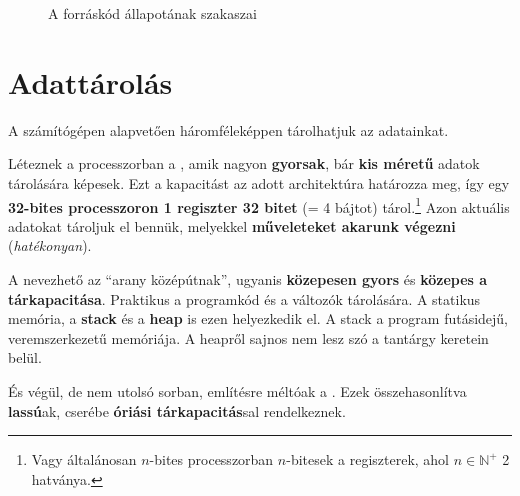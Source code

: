 \begin{figure}[h]
	\centering
	\caption{A forráskód állapotának szakaszai}
\end{figure}

\newpage

\section{Adattárolás}

A számítógépen alapvetően háromféleképpen tárolhatjuk az adatainkat.

Léteznek a processzorban a  , amik nagyon \textbf{gyorsak}, bár \textbf{kis méretű} adatok tárolására képesek. Ezt a kapacitást az adott architektúra határozza meg, így egy \textbf{32-bites processzoron 1 regiszter 32 bitet} (= 4 bájtot) tárol.\footnote{Vagy általánosan $n$-bites processzorban $n$-bitesek a regiszterek, ahol $n\in \mathbb{N}^+$ 2 hatványa.} Azon aktuális adatokat tároljuk el bennük, melyekkel \textbf{műveleteket akarunk végezni} (\textit{hatékonyan}).

A  nevezhető az ``arany középútnak'', ugyanis \textbf{közepesen gyors} és \textbf{közepes a tárkapacitása}. Praktikus a programkód és a változók tárolására. A statikus memória, a \textbf{stack} és a \textbf{heap} is ezen helyezkedik el. A stack a program futásidejű, veremszerkezetű memóriája. A heapről sajnos nem lesz szó a tantárgy keretein belül.

És végül, de nem utolsó sorban, említésre méltóak a  . Ezek összehasonlítva \textbf{lassú}ak, cserébe \textbf{óriási tárkapacitás}sal rendelkeznek.

